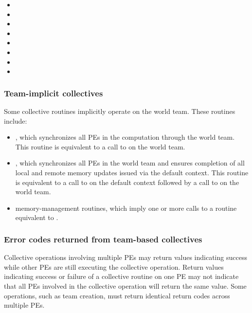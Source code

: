 \begin{DeprecateBlock}
\begin{itemize}
\item {}
\item {}
\item {}
\item {}
\item {}
\item {}
\item {}
\item {}
\end{itemize}

\end{DeprecateBlock}


\subsubsection*{Team-implicit collectives}

Some \openshmem collective routines implicitly operate on the world
team. These routines include:

\begin{itemize}
\item {}, which synchronizes all \acp{PE} in the
  computation through the world team. This routine is equivalent to a
  call to  on the world team.
\item {}, which synchronizes all \acp{PE} in
  the world team and ensures completion of all local and remote memory
  updates issued via the default context.  This routine is equivalent to
  a call to  on the default context followed by a
  call to  on the world team.
\item \openshmem memory-management routines, which imply one or more
  calls to a routine equivalent to .
\end{itemize}

\subsubsection*{Error codes returned from team-based collectives}

Collective operations involving multiple \acp{PE} may return values
indicating success while other \acp{PE} are still executing the
collective operation. Return values indicating success or failure of a
collective routine on one \ac{PE} may not indicate that all \acp{PE}
involved in the collective operation will return the same value. Some
operations, such as team creation, must return identical return codes
across multiple \acp{PE}.
